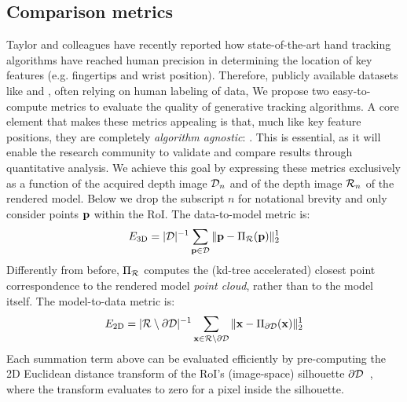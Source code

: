 \subsection*{Comparison metrics}
Taylor and colleagues \cite{taylor2016joint} have recently reported how state-of-the-art hand tracking algorithms have reached human precision in determining the location of key features (e.g. fingertips and wrist position). 
Therefore, publicly available datasets like \cite{tompson2014real} and \cite{sridhar2013multicam}, often relying on human labeling of data, 
% 
We propose two easy-to-compute metrics to evaluate the quality of generative tracking algorithms. A core element that makes these metrics appealing is that, much like key feature positions, they are completely \emph{algorithm agnostic}: . This is essential, as it will enable the research community to validate and compare results through quantitative analysis. 
% 
We achieve this goal by expressing these metrics exclusively as a function of the acquired depth image $\mathcal{D}_n$ and of the depth image $\mathcal{R}_{n}$ of the rendered model. 
Below we drop the subscript $n$ for notational brevity and only consider points  $\mathbf{p}$ within the RoI.
% 
The data-to-model metric is: %
% 
\begin{equation}
E_\text{3D} = |\mathcal{D}|^{-1} \sum_{\mathbf{p} \in \mathcal{D}} \| \mathbf{p} - \Pi_{\mathcal{R}}(\mathbf{p}) \|_2^1
\label{eq:metric1}
\end{equation}
% 
Differently from before, $\Pi_{\mathcal{R}}$ computes the (kd-tree accelerated) closest point correspondence to the rendered model \emph{point cloud}, rather than to the model itself. 
% 
The model-to-data metric is: %
\begin{eqnarray}
E_\text{2D} = |\mathcal{R} \setminus \partial\mathcal{D}|^{-1} 
\sum_{\mathbf{x} \in \mathcal{R} \setminus \partial\mathcal{D}} \| \mathbf{x} - \Pi_{\partial\mathcal{D}}(\mathbf{x}) \|^1_2
\label{eq:metric2}
\end{eqnarray}
%
Each summation term above can be evaluated efficiently by pre-computing the 2D Euclidean distance transform of the RoI's (image-space) silhouette $\partial \mathcal{D}$~\cite{tagliasacchi2015robust}, where the transform evaluates to zero for a pixel inside the silhouette.
% 

